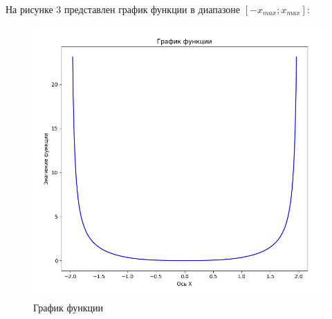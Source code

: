\clearpage

На рисунке 3 представлен график функции в диапазоне $[-x_{max};x_{max}]$:
\FloatBarrier
\begin{figure}[h]
	\begin{center}
		\includegraphics[width=\linewidth]{inc/graph.png}
	\end{center}
	\caption{График функции}
\end{figure}
\FloatBarrier
